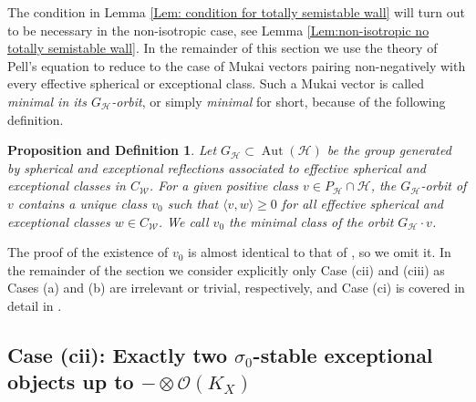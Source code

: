 \documentclass[leqno,11pt]{amsart}
\def\Aut{\mathop{\mathrm{Aut}}\nolimits}
\newtheorem{PropDef}[Thm]{Proposition and Definition}
\theoremstyle{definition}
\def\HH{\ensuremath{\mathcal H}}
\def\OO{\ensuremath{\mathcal O}}
\def\WW{\ensuremath{\mathcal W}}
\begin{document}
The condition in Lemma \ref{Lem: condition for totally semistable wall} will turn out to be necessary in the non-isotropic case, see Lemma \ref{Lem:non-isotropic no totally semistable wall}.  In the remainder of this section we use the theory of Pell's equation to reduce to the case of Mukai vectors pairing non-negatively with every effective spherical or exceptional class.  Such a Mukai vector is called \emph{minimal in its $G_{\HH}$-orbit}, or simply \emph{minimal} for short, because of the following definition.

\begin{PropDef}\label{PropDef: minimal vectors}
Let $G_{\HH}\subset\Aut(\HH)$ be the group generated by spherical and exceptional reflections associated to effective spherical and exceptional classes in $C_{\WW}$.  For a given positive class $v\in P_{\HH}\cap\HH$, the $G_{\HH}$-orbit of $v$ contains a unique class $v_0$ such that $\langle v,w\rangle\geq 0$ for all effective spherical and exceptional classes $w\in C_{\WW}$.  We call $v_0$ the minimal class of the orbit $G_{\HH}\cdot v$.
\end{PropDef}

The proof of the existence of $v_0$ is almost identical to that of \cite[Proposition and Definition 6.6]{BM14b}, so we omit it.  In the remainder of the section we consider explicitly only Case (cii) and (ciii) as Cases (a) and (b) are irrelevant or trivial, respectively, and Case (ci) is covered in detail in \cite[Section 6]{BM14b}.

\subsection{Case (cii): Exactly two $\sigma_0$-stable exceptional objects up to $-\otimes\OO(K_X)$}
\end{document}
